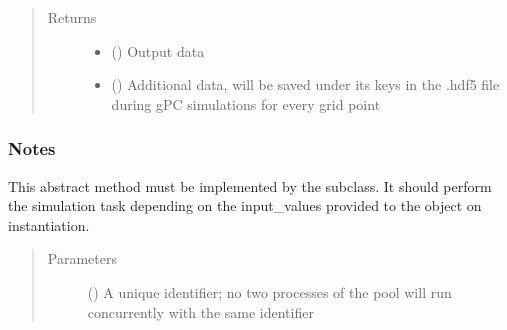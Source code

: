 \documentclass[letterpaper,10pt,english,openany,oneside]{sphinxmanual}
\begin{document}
\begin{fulllineitems}
\begin{quote}
\begin{description}
\begin{itemize}
\end{itemize}

\item[{Returns}] \leavevmode
\begin{itemize}
\item {} 
 () \textendash{} Output data

\item {} 
 () \textendash{} Additional data, will be saved under its keys in the .hdf5 file during gPC simulations for every grid point

\end{itemize}


\end{description}\end{quote}
\subsubsection*{Notes}

\begin{figure}[htbp]
\centering

\noindent{}
\end{figure}

\begin{fulllineitems}
\label{\detokenize{pygpc.testfunctions:pygpc.testfunctions.testfunctions.Peaks.simulate}}
This abstract method must be implemented by the subclass.
It should perform the simulation task depending on the input\_values provided to the object on instantiation.
\begin{quote}\begin{description}
\item[{Parameters}] \leavevmode
{} () \textendash{} A unique identifier; no two processes of the pool will run concurrently with the same identifier

\end{description}\end{quote}

\end{fulllineitems}


\end{fulllineitems}
\end{document}
